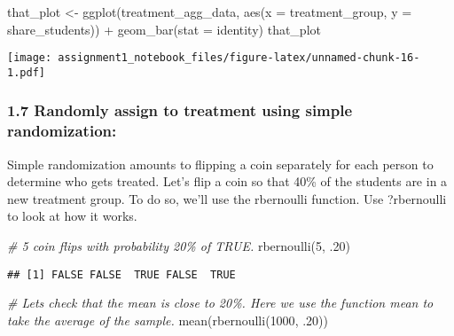 \documentclass[
]{article}
\newenvironment{Shaded}{\begin{snugshade}}{\end{snugshade}}
\newcommand{\AttributeTok}[1]{\textcolor[rgb]{0.77,0.63,0.00}{#1}}
\newcommand{\CommentTok}[1]{\textcolor[rgb]{0.56,0.35,0.01}{\textit{#1}}}
\newcommand{\DecValTok}[1]{\textcolor[rgb]{0.00,0.00,0.81}{#1}}
\newcommand{\FunctionTok}[1]{\textcolor[rgb]{0.00,0.00,0.00}{#1}}
\newcommand{\NormalTok}[1]{#1}
\newcommand{\OtherTok}[1]{\textcolor[rgb]{0.56,0.35,0.01}{#1}}
\newcommand{\SpecialCharTok}[1]{\textcolor[rgb]{0.00,0.00,0.00}{#1}}
\newcommand{\StringTok}[1]{\textcolor[rgb]{0.31,0.60,0.02}{#1}}
\begin{document}
\begin{Shaded}
\begin{Highlighting}[]
\NormalTok{that\_plot }\OtherTok{\textless{}{-}} \FunctionTok{ggplot}\NormalTok{(treatment\_agg\_data, }\FunctionTok{aes}\NormalTok{(}\AttributeTok{x =}\NormalTok{ treatment\_group, }\AttributeTok{y =}\NormalTok{ share\_students)) }\SpecialCharTok{+} \FunctionTok{geom\_bar}\NormalTok{(}\AttributeTok{stat =} \StringTok{\textquotesingle{}identity\textquotesingle{}}\NormalTok{)}
\NormalTok{that\_plot}
\end{Highlighting}
\end{Shaded}

\texttt{[image: assignment1\_notebook\_files/figure-latex/unnamed-chunk-16-1.pdf]}

\hypertarget{randomly-assign-to-treatment-using-simple-randomization}{%
\subsubsection{1.7 Randomly assign to treatment using simple
randomization:}\label{randomly-assign-to-treatment-using-simple-randomization}}

Simple randomization amounts to flipping a coin separately for each
person to determine who gets treated. Let's flip a coin so that 40\% of
the students are in a new treatment group. To do so, we'll use the
rbernoulli function. Use ?rbernoulli to look at how it works.

\begin{Shaded}
\begin{Highlighting}[]
\CommentTok{\# 5 coin flips with probability 20\% of TRUE.}
\FunctionTok{rbernoulli}\NormalTok{(}\DecValTok{5}\NormalTok{, .}\DecValTok{20}\NormalTok{)}
\end{Highlighting}
\end{Shaded}

\begin{verbatim}
## [1] FALSE FALSE  TRUE FALSE  TRUE
\end{verbatim}

\begin{Shaded}
\begin{Highlighting}[]
\CommentTok{\# Let\textquotesingle{}s check that the mean is close to 20\%. Here we use the function mean to take the average of the sample.}
\FunctionTok{mean}\NormalTok{(}\FunctionTok{rbernoulli}\NormalTok{(}\DecValTok{1000}\NormalTok{, .}\DecValTok{20}\NormalTok{))}
\end{Highlighting}
\end{Shaded}
\end{document}
